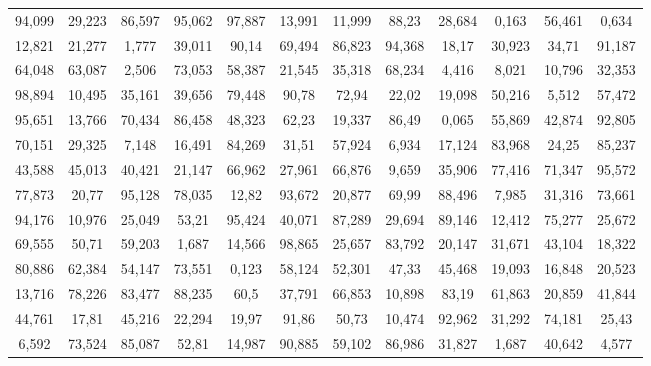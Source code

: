 \documentclass[12pt,ngerman]{standalone}
\begin{document}
\begin{tabular}{SSSSSSSSSSSS}
94,099	&	29,223	&	86,597	&	95,062	&	97,887	&	13,991	&	11,999	&	88,23	&	28,684	&	0,163	&	56,461	&	0,634	\\
12,821	&	21,277	&	1,777	&	39,011	&	90,14	&	69,494	&	86,823	&	94,368	&	18,17	&	30,923	&	34,71	&	91,187	\\
64,048	&	63,087	&	2,506	&	73,053	&	58,387	&	21,545	&	35,318	&	68,234	&	4,416	&	8,021	&	10,796	&	32,353	\\
98,894	&	10,495	&	35,161	&	39,656	&	79,448	&	90,78	&	72,94	&	22,02	&	19,098	&	50,216	&	5,512	&	57,472	\\
95,651	&	13,766	&	70,434	&	86,458	&	48,323	&	62,23	&	19,337	&	86,49	&	0,065	&	55,869	&	42,874	&	92,805	\\
70,151	&	29,325	&	7,148	&	16,491	&	84,269	&	31,51	&	57,924	&	6,934	&	17,124	&	83,968	&	24,25	&	85,237	\\
43,588	&	45,013	&	40,421	&	21,147	&	66,962	&	27,961	&	66,876	&	9,659	&	35,906	&	77,416	&	71,347	&	95,572	\\
77,873	&	20,77	&	95,128	&	78,035	&	12,82	&	93,672	&	20,877	&	69,99	&	88,496	&	7,985	&	31,316	&	73,661	\\
94,176	&	10,976	&	25,049	&	53,21	&	95,424	&	40,071	&	87,289	&	29,694	&	89,146	&	12,412	&	75,277	&	25,672	\\
69,555	&	50,71	&	59,203	&	1,687	&	14,566	&	98,865	&	25,657	&	83,792	&	20,147	&	31,671	&	43,104	&	18,322	\\
80,886	&	62,384	&	54,147	&	73,551	&	0,123	&	58,124	&	52,301	&	47,33	&	45,468	&	19,093	&	16,848	&	20,523	\\
13,716	&	78,226	&	83,477	&	88,235	&	60,5	&	37,791	&	66,853	&	10,898	&	83,19	&	61,863	&	20,859	&	41,844	\\
44,761	&	17,81	&	45,216	&	22,294	&	19,97	&	91,86	&	50,73	&	10,474	&	92,962	&	31,292	&	74,181	&	25,43	\\
6,592	&	73,524	&	85,087	&	52,81	&	14,987	&	90,885	&	59,102	&	86,986	&	31,827	&	1,687	&	40,642	&	4,577	\\
\end{tabular}
\end{document}
